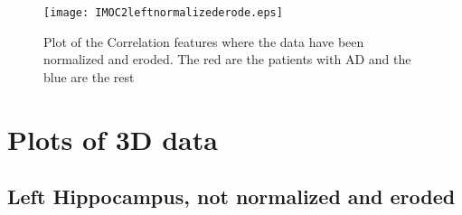 \begin{figure}[H]
  \centering
  \texttt{[image: IMOC2leftnormalizederode.eps]}
  \caption{Plot of the Correlation features where the data have been normalized and eroded. The red are the patients with AD and the blue are the rest}\label{fig:ContrastLeftNormalizedEroded}
\end{figure}

\section{Plots of 3D data}

\subsection{Left Hippocampus, not normalized and eroded}
